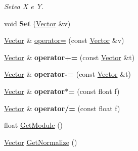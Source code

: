 \begin{DoxyCompactItemize}
\begin{DoxyCompactList}\small\item\em Setea X e Y. \end{DoxyCompactList}\item 
\hypertarget{classVector_afd28980f3852c328db683e49635e318d}{void {\bfseries Set} (\hyperlink{classVector}{Vector} \&v)}\label{classVector_afd28980f3852c328db683e49635e318d}

\item 
\hyperlink{classVector}{Vector} \& \hyperlink{classVector_ae48c467a9f65d60e2f7455aba4ca1239}{operator=} (const \hyperlink{classVector}{Vector} \&v)
\item 
\hypertarget{classVector_ad06a3f604c7d23c532853b52ddb2b23d}{\hyperlink{classVector}{Vector} \& {\bfseries operator+=} (const \hyperlink{classVector}{Vector} \&t)}\label{classVector_ad06a3f604c7d23c532853b52ddb2b23d}

\item 
\hypertarget{classVector_a749ed57358829f920f201745ad040476}{\hyperlink{classVector}{Vector} \& {\bfseries operator-\/=} (const \hyperlink{classVector}{Vector} \&t)}\label{classVector_a749ed57358829f920f201745ad040476}

\item 
\hypertarget{classVector_ab475df273e334d79c16a58933dec45d4}{\hyperlink{classVector}{Vector} \& {\bfseries operator$\ast$=} (const float f)}\label{classVector_ab475df273e334d79c16a58933dec45d4}

\item 
\hypertarget{classVector_aea366e136af0a69b0115aa52e1f67b1e}{\hyperlink{classVector}{Vector} \& {\bfseries operator/=} (const float f)}\label{classVector_aea366e136af0a69b0115aa52e1f67b1e}

\item 
float \hyperlink{classVector_ae6df47f51fec695b3dabcb9a5fd8079c}{Get\-Module} ()
\item 
\hyperlink{classVector}{Vector} \hyperlink{classVector_ae7db6e0671ea63871cdcce0ffad86b86}{Get\-Normalize} ()
\end{DoxyCompactItemize}


